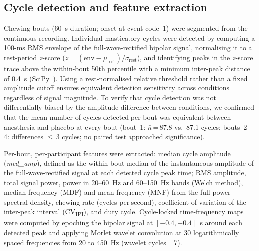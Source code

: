 \subsection*{Cycle detection and feature extraction}

Chewing bouts (60~s duration; onset at event code~1) were segmented from the
continuous recording.
Individual masticatory cycles were detected by computing a 100-ms RMS envelope
of the full-wave-rectified bipolar signal, normalising it to a rest-period
$z$-score ($z = (\text{env} - \mu_{\text{rest}}) / \sigma_{\text{rest}}$), and
identifying peaks in the $z$-score trace above the within-bout 50th percentile
with a minimum inter-peak distance of 0.4~s (SciPy~\cite{SciPy2020}).
Using a rest-normalised relative threshold rather than a fixed amplitude cutoff
ensures equivalent detection sensitivity across conditions regardless of signal
magnitude.
To verify that cycle detection was not differentially biased by the amplitude
difference between conditions, we confirmed that the mean number of cycles
detected per bout was equivalent between anesthesia and placebo at every bout
(bout~1: $\bar{n}$\,=\,87.8 vs.\ 87.1 cycles; bouts~2--4: differences
$\leq$\,3 cycles; no paired test approached significance).

Per-bout, per-participant features were extracted: median cycle amplitude
(\textit{med\_amp}), defined as the within-bout median of the instantaneous
amplitude of the full-wave-rectified signal at each detected cycle peak time;
RMS amplitude, total signal power, power in 20--60~Hz and
60--150~Hz bands (Welch method), median frequency (MDF) and mean frequency (MNF)
from the full power spectral density, chewing rate (cycles per second),
coefficient of variation of the inter-peak interval (CV\textsubscript{IPI}), and
duty cycle.
Cycle-locked time-frequency maps were computed by epoching the bipolar signal at
$[-0.4, +0.4]$~s around each detected peak and applying Morlet wavelet
convolution at 30 logarithmically spaced frequencies from 20 to 450~Hz
(wavelet cycles\,=\,7).

